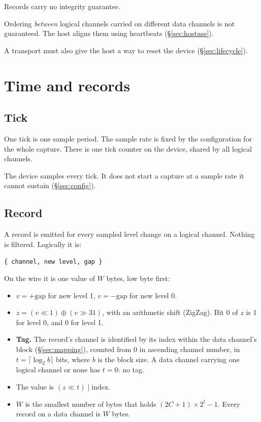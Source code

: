 \documentclass[11pt,a4paper]{article}
\newcommand{\sref}[1]{\S\ref{#1}}
\begin{document}
Records carry no integrity guarantee.

Ordering \emph{between} logical channels carried on different data channels is not
guaranteed. The host aligns them using heartbeats (\sref{sec:hostuse}).

A transport must also give the host a way to reset the device (\sref{sec:lifecycle}).

\section{Time and records}\label{sec:time}

\subsection{Tick}\label{sec:tick}

One tick is one sample period. The sample rate is fixed by the configuration for the
whole capture. There is one tick counter on the device, shared by all logical channels.

The device samples every tick. It does not start a capture at a sample rate it cannot
sustain (\sref{sec:config}).

\subsection{Record}\label{sec:record}

A record is emitted for every sampled level change on a logical channel. Nothing is
filtered. Logically it is:

\begin{center}
\texttt{\{ channel, new level, gap \}}
\end{center}

On the wire it is one value of $W$ bytes, low byte first:

\begin{itemize}
  \item $v = +\mathrm{gap}$ for new level 1, $v = -\mathrm{gap}$ for new level 0.
  \item $z = (v \ll 1) \oplus (v \gg 31)$, with an arithmetic shift (ZigZag). Bit 0 of
        $z$ is 1 for level 0, and 0 for level 1.
  \item \textbf{Tag.} The record's channel is identified by its index within the
        data channel's block (\sref{sec:mapping}), counted from 0 in ascending channel
        number, in $t = \lceil \log_2 b \rceil$ bits, where $b$ is the block size. A
        data channel carrying one logical channel or none has $t = 0$: no tag.
  \item The value is $(z \ll t) \mid \mathrm{index}$.
  \item $W$ is the smallest number of bytes that holds $(2C + 1) \times 2^t - 1$. Every
        record on a data channel is $W$ bytes.
\end{itemize}
\end{document}
